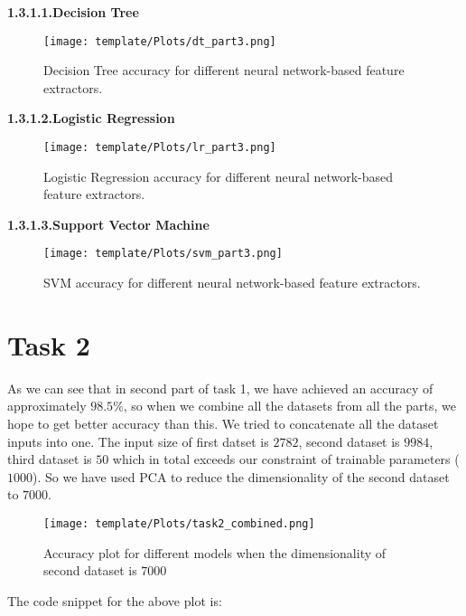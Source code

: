 \documentclass{article} %
\begin{document}
\textbf{1.3.1.1.\hspace{0.3cm}Decision Tree}
\begin{figure}[htbp]
    \centering
    \texttt{[image: template/Plots/dt\_part3.png]}
    \caption{Decision Tree accuracy for different neural network-based feature extractors.}
    \label{fig:10}
\end{figure}

\textbf{1.3.1.2.\hspace{0.3cm}Logistic Regression}
\begin{figure}[htbp]
    \centering
    \texttt{[image: template/Plots/lr\_part3.png]}
    \caption{Logistic Regression accuracy for different neural network-based feature extractors.}
    \label{fig:11}
\end{figure}

\textbf{1.3.1.3.\hspace{0.3cm}Support Vector Machine}
\begin{figure}[htbp]
    \centering
    \texttt{[image: template/Plots/svm\_part3.png]}
    \caption{SVM accuracy for different neural network-based feature extractors.}
    \label{fig:12}
\end{figure}

\section{Task 2}
As we can see that in second part of task 1, we have achieved an accuracy of approximately $98.5\%$, so when we combine all the datasets from all the parts, we hope to get better accuracy than this. We tried to concatenate all the dataset inputs into one. The input size of first datset is $2782$, second dataset is $9984$, third dataset is $50$ which in total exceeds our constraint of trainable parameters ($1000$). So we have used PCA to reduce the dimensionality of the second dataset to $7000$. 
\begin{figure}[htbp]
    \centering
    \texttt{[image: template/Plots/task2\_combined.png]}
    \caption{Accuracy plot for different models when the dimensionality of second dataset is $7000$}
    \label{fig:13}
\end{figure}

The code snippet for the above plot is: 
\end{document}
